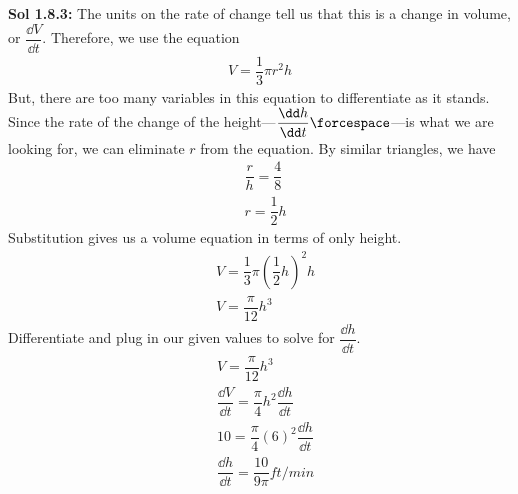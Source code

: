 \begin{tcolorbox}[solution]
    \textbf{Sol 1.8.3: } The units on the rate of change tell us that this is a change in volume, or $\dfrac{\dd V}{\dd t}$. Therefore, we use the equation \begin{align*}
        V = \dfrac{1}{3}\pi r^2h
    \end{align*}
    But, there are too many variables in this equation to differentiate as it stands. Since the rate of the change of the height---$\dfrac{\dd h}{\dd t} \forcespace$---is what we are looking for, we can eliminate $r$ from the equation. By similar triangles, we have \begin{align*}
        & \dfrac{r}{h} = \dfrac{4}{8} \\[11pt]
        & r = \dfrac{1}{2}h
    \end{align*}
    Substitution gives us a volume equation in terms of only height. \begin{align*}
        & V = \dfrac{1}{3}\pi\left(\dfrac{1}{2}h\right)^2h \\[11pt]
        & V = \dfrac{\pi}{12}h^3
    \end{align*}
    Differentiate and plug in our given values to solve for $\dfrac{\dd h}{\dd t}$. \begin{align*}
        & V = \dfrac{\pi}{12}h^3 \\[11pt]
        & \dfrac{\dd V}{\dd t} = \dfrac{\pi}{4}h^2\dfrac{\dd h}{\dd t} \\[11pt]
        & 10 = \dfrac{\pi}{4}(6)^2\dfrac{\dd h}{\dd t} \\[11pt]
        & \dfrac{\dd h}{\dd t} = \boxed{\dfrac{10}{9\pi} \si{ft \per min}}
    \end{align*}
\end{tcolorbox} \vspace{11pt}

